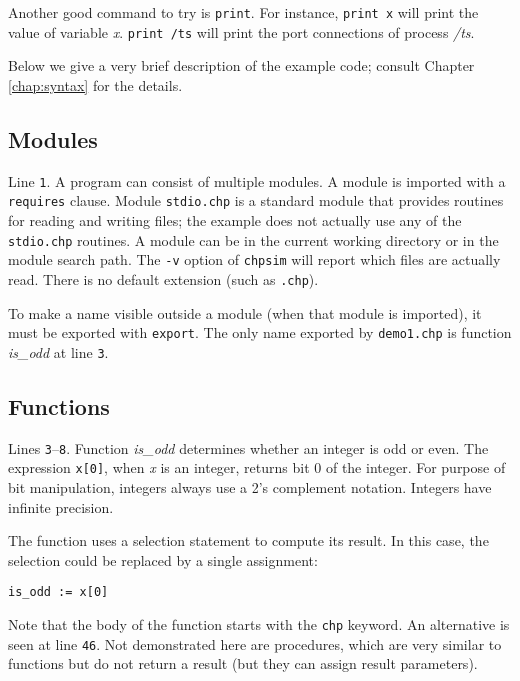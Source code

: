 Another good command to try is {\tt{}print}. For instance, {\tt{}print x} will print
the value of variable {\it{}x}. {\tt{}print /ts} will print the port connections
of process {\it{}/ts}.

Below we give a very brief description of the example code; consult
Chapter \ref{chap:syntax} for the details.


\subsection{Modules}\label{sec:demorequire}

Line {\tt{}1}.
A program can consist of multiple modules. A module is imported with
a {\tt{}requires} clause. Module {\tt{}stdio.chp} is a standard module that
provides routines for reading and writing files; the example does not
actually use any of the {\tt{}stdio.chp} routines. A module can be in
the current working directory or in the module search path. The {\tt{}-v} option
of {\tt{}chpsim} will report which files are actually read. There is no
default extension (such as {\tt{}.chp}).

To make a name visible outside a module (when that module is imported),
it must be exported with {\tt{}export}. The only name exported by
{\tt{}demo1.chp} is function {\it{}is\_odd} at line {\tt{}3}.


\subsection{Functions}\label{sec:demofunction}

Lines {\tt{}3}--{\tt{}8}.
Function {\it{}is\_odd} determines whether an integer is odd or even. The
expression {\tt{}x[0]}, when {\it{}x} is an integer, returns bit 0 of the integer.
For purpose of bit manipulation, integers always use a 2's complement
notation. Integers have infinite precision.

The function uses a selection statement to compute its result. In this
case, the selection could be replaced by a single assignment:
\begin{verbatim}
is_odd := x[0]
\end{verbatim}

Note that the body of the function starts with the {\tt{}chp} keyword. An
alternative is seen at line {\tt{}46}. Not demonstrated here are procedures,
which are very similar to functions but do not return a result (but
they can assign result parameters).

